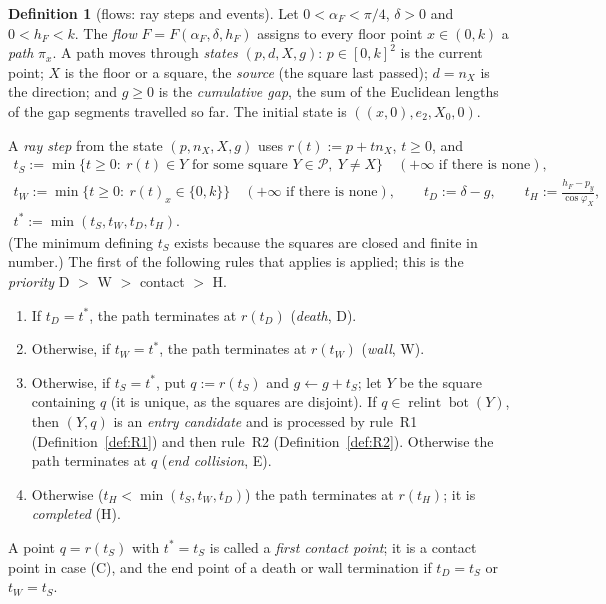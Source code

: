\documentclass[11pt]{amsart}
\newcommand{\relint}{\operatorname{relint}}
\newcommand{\Bot}{\operatorname{bot}}
\theoremstyle{definition}
\newtheorem{definition}[theorem]{Definition}
\theoremstyle{remark}
\numberwithin{equation}{section}
\begin{document}
\begin{definition}[flows: ray steps and events]\label{def:flow}
Let $0<\alpha_F<\pi/4$, $\delta>0$ and $0<h_F<k$. The \emph{flow} $F=F(\alpha_F,\delta,h_F)$ assigns to every floor
point $x\in(0,k)$ a \emph{path} $\pi_x$. A path moves through \emph{states} $(p,d,X,g)$: $p\in[0,k]^2$ is the current
point; $X$ is the floor or a square, the \emph{source} (the square last passed); $d=n_X$ is the direction; and $g\ge0$
is the \emph{cumulative gap}, the sum of the Euclidean lengths of the gap segments travelled so far. The initial state
is $((x,0),e_2,X_0,0)$.

A \emph{ray step} from the state $(p,n_X,X,g)$ uses $r(t):=p+tn_X$, $t\ge0$, and
\begin{gather*}
t_S:=\min\{t\ge0:\ r(t)\in Y\text{ for some square }Y\in\mathcal P,\ Y\ne X\}\quad(+\infty\text{ if there is none}),\\
t_W:=\min\{t\ge0:\ r(t)_x\in\{0,k\}\}\quad(+\infty\text{ if there is none}),\qquad t_D:=\delta-g,\qquad
t_H:=\frac{h_F-p_y}{\cos\varphi_X},\\
t^*:=\min(t_S,t_W,t_D,t_H).
\end{gather*}
(The minimum defining $t_S$ exists because the squares are closed and finite in number.) The first of the following
rules that applies is applied; this is the \emph{priority} D $>$ W $>$ contact $>$ H.
\begin{enumerate}
\item[(D)] If $t_D=t^*$, the path terminates at $r(t_D)$ (\emph{death}, D).
\item[(W)] Otherwise, if $t_W=t^*$, the path terminates at $r(t_W)$ (\emph{wall}, W).
\item[(C)] Otherwise, if $t_S=t^*$, put $q:=r(t_S)$ and $g\leftarrow g+t_S$; let $Y$ be the square containing $q$
(it is unique, as the squares are disjoint). If $q\in\relint\Bot(Y)$, then $(Y,q)$ is an \emph{entry candidate} and is
processed by rule~R1 (Definition~\ref{def:R1}) and then rule~R2 (Definition~\ref{def:R2}). Otherwise the path
terminates at $q$ (\emph{end collision}, E).
\item[(H)] Otherwise ($t_H<\min(t_S,t_W,t_D)$) the path terminates at $r(t_H)$; it is \emph{completed} (H).
\end{enumerate}
A point $q=r(t_S)$ with $t^*=t_S$ is called a \emph{first contact point}; it is a contact point in case (C), and the
end point of a death or wall termination if $t_D=t_S$ or $t_W=t_S$.
\end{definition}
\end{document}
